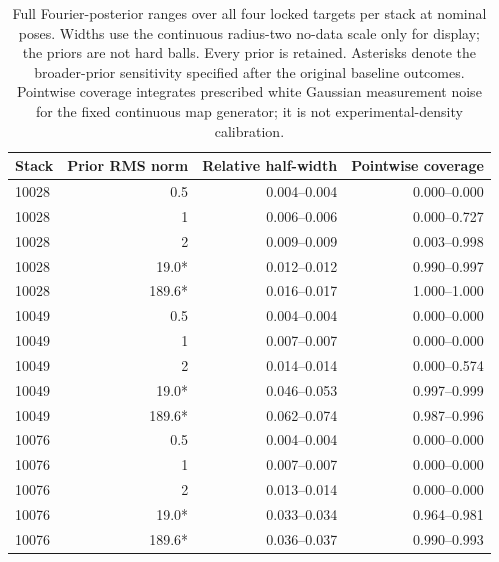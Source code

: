 \begin{table}[t]
\centering\small
\begin{tabular}{lrrr}
\toprule
Stack & Prior RMS norm & Relative half-width & Pointwise coverage\\
\midrule
10028 & 0.5 & 0.004--0.004 & 0.000--0.000\\
10028 & 1 & 0.006--0.006 & 0.000--0.727\\
10028 & 2 & 0.009--0.009 & 0.003--0.998\\
10028 & 19.0* & 0.012--0.012 & 0.990--0.997\\
10028 & 189.6* & 0.016--0.017 & 1.000--1.000\\
10049 & 0.5 & 0.004--0.004 & 0.000--0.000\\
10049 & 1 & 0.007--0.007 & 0.000--0.000\\
10049 & 2 & 0.014--0.014 & 0.000--0.574\\
10049 & 19.0* & 0.046--0.053 & 0.997--0.999\\
10049 & 189.6* & 0.062--0.074 & 0.987--0.996\\
10076 & 0.5 & 0.004--0.004 & 0.000--0.000\\
10076 & 1 & 0.007--0.007 & 0.000--0.000\\
10076 & 2 & 0.013--0.014 & 0.000--0.000\\
10076 & 19.0* & 0.033--0.034 & 0.964--0.981\\
10076 & 189.6* & 0.036--0.037 & 0.990--0.993\\
\bottomrule
\end{tabular}
\caption{Full Fourier-posterior ranges over all four locked targets per stack at nominal poses. Widths use the continuous radius-two no-data scale only for display; the priors are not hard balls. Every prior is retained. Asterisks denote the broader-prior sensitivity specified after the original baseline outcomes. Pointwise coverage integrates prescribed white Gaussian measurement noise for the fixed continuous map generator; it is not experimental-density calibration.}
\label{tab:pilot-fourier}
\end{table}
